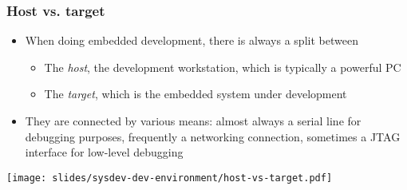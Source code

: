 %

\begin{frame}
  \frametitle{Host vs. target}
  \begin{itemize}
  \item When doing embedded development, there is always a split between
    \begin{itemize}
    \item The {\em host}, the development workstation, which is
      typically a powerful PC
    \item The {\em target}, which is the embedded system under
      development
    \end{itemize}
  \item They are connected by various means: almost always a serial
    line for debugging purposes, frequently a networking connection,
    sometimes a JTAG interface for low-level debugging
  \end{itemize}
  \begin{center}
    \texttt{[image: slides/sysdev-dev-environment/host-vs-target.pdf]}
  \end{center}
\end{frame}


